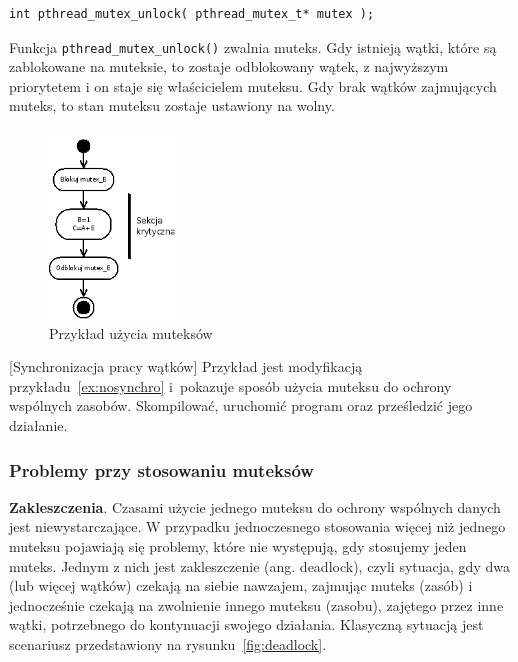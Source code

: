 \begin{lstlisting}[style=MyCStyle]
int pthread_mutex_unlock( pthread_mutex_t* mutex );
\end{lstlisting}

Funkcja \lstinline[style=MyCStyle]{pthread_mutex_unlock()} zwalnia muteks. Gdy istnieją wątki, które są zablokowane na muteksie, to zostaje odblokowany wątek, z najwyższym priorytetem i on staje się właścicielem muteksu. Gdy brak wątków zajmujących muteks, to stan muteksu zostaje ustawiony na wolny.

\begin{figure}[!h]
\centering
\includegraphics[width=0.3\textwidth]{img/thrd_mutex}
\caption{Przykład użycia muteksów}
\label{fig:mutex}
\end{figure}

\begin{example}{[Synchronizacja pracy wątków]}
Przykład jest modyfikacją przykładu~\ref{ex:nosynchro} i~pokazuje sposób użycia muteksu do ochrony wspólnych zasobów. Skompilować, uruchomić program oraz prześledzić jego działanie.


\end{example}

\subsubsection{Problemy przy stosowaniu muteksów}

\textbf{Zakleszczenia}. Czasami użycie jednego muteksu do ochrony wspólnych danych jest niewystarczające. W przypadku jednoczesnego stosowania więcej niż jednego muteksu pojawiają się problemy, które nie występują, gdy stosujemy jeden muteks. Jednym z nich jest zakleszczenie (ang. deadlock), czyli sytuacja, gdy dwa (lub więcej wątków) czekają na siebie nawzajem, zajmując muteks (zasób) i jednocześnie czekają na zwolnienie innego muteksu (zasobu), zajętego przez inne wątki, potrzebnego do kontynuacji swojego działania. Klasyczną sytuacją jest scenariusz przedstawiony na rysunku~\ref{fig:deadlock}.

